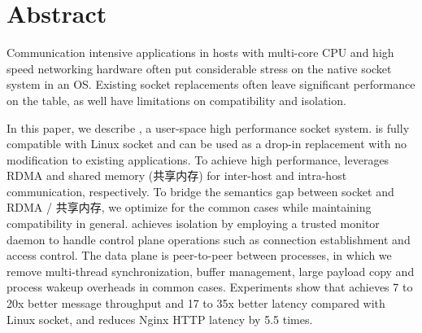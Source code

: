 \section*{Abstract}

Communication intensive applications in hosts with multi-core CPU and high speed networking hardware often put considerable stress on the native socket system in an OS. 
Existing socket replacements often leave significant performance on the table, as well have limitations on compatibility and isolation.



In this paper, we describe \sys, a user-space high performance socket system.
\sys is fully compatible with Linux socket and can be used as a drop-in replacement with no modification to existing applications.
To achieve high performance, \sys{} leverages RDMA and shared memory (共享内存) for inter-host and intra-host communication, respectively.
To bridge the semantics gap between socket and RDMA / 共享内存, we optimize for the common cases while maintaining compatibility in general.
\sys achieves isolation by employing a trusted monitor daemon to handle control plane operations such as connection establishment and access control.
The data plane is peer-to-peer between processes, in which we remove multi-thread synchronization, buffer management, large payload copy and process wakeup overheads in common cases.
Experiments show that \sys achieves 7 to 20x better message throughput and 17 to 35x better latency compared with Linux socket, and reduces Nginx HTTP latency by 5.5 times.
